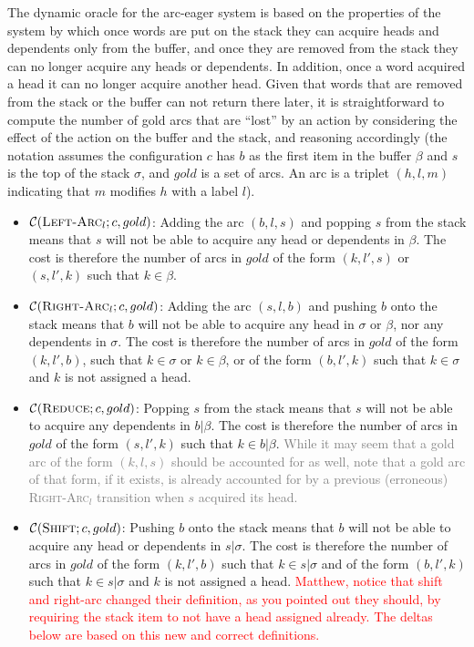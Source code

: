 \documentclass[11pt,letterpaper]{article}
\newcommand{\maybe}[1]{\textcolor{gray}{#1}}
\newcommand{\note}[1]{\textcolor{red}{#1}}
\begin{document}
The dynamic oracle for the arc-eager system is based on the properties of the
system by which once words are put on the stack they can acquire heads and
dependents only from the buffer, and once they are removed from the stack they
can no longer acquire any heads or dependents. In addition, once a word
acquired a head it can no longer acquire another head.  Given that words that
are removed from the stack or the buffer can not return there later, it
is straightforward to compute the number of gold arcs that are ``lost'' by an
action by considering the effect of the action on the buffer and the stack,
and reasoning accordingly (the notation assumes the configuration $c$ has $b$
as the first item in the buffer $\beta$ and $s$ is the top of the stack
$\sigma$, and $gold$ is a set of arcs. An arc is a triplet $(h,l,m)$
indicating that $m$ modifies $h$ with a label $l$).




\begin{itemize}
   \item $\mathcal{C}(\textsc{Left-Arc}_l; c, gold)$: 
Adding the arc $(b, l, s)$ and popping $s$ from the stack means that $s$ will not be able
to acquire any head or dependents in $\beta$. The cost is therefore the number of arcs 
in $gold$ of the form $(k, l', s)$ or $(s, l', k)$ such that $k \in \beta$.

\item $\mathcal{C}(\textsc{Right-Arc}_l; c, gold)$: 
Adding the arc $(s, l, b)$ and pushing $b$ onto the stack means that $b$ will 
not be able to acquire any head in $\sigma$ or $\beta$, nor any dependents in $\sigma$. 
The cost is therefore the number of arcs in $gold$ of the form $(k, l', b)$,
such that $k \in \sigma$ or $k \in \beta$, 
or of the form $(b, l', k)$ such that $k \in \sigma$ 
and $k$ is not assigned a head.

\item $\mathcal{C}(\textsc{Reduce}; c, gold)$: 
Popping $s$ from the stack means that $s$ will not be able to acquire any dependents
in $b|\beta$. The cost is therefore the number of arcs in $gold$ of the form $(s, l', k)$
such that $k \in b|\beta$. \maybe{While it may seem that a gold arc of the form $(k, l, s)$ should be accounted for as well,
note that a gold arc of that form, if it exists, is already accounted for by a previous (erroneous) \textsc{Right-Arc}$_l$ 
transition when $s$ acquired its head.}

\item $\mathcal{C}(\textsc{Shift}; c, gold)$: 
Pushing $b$ onto the stack means that $b$ will not be able to acquire any head
or dependents in $s|\sigma$. The cost is therefore the number of arcs in $gold$ of 
the form $(k, l', b)$ such that $k \in s|\sigma$ and of the form $(b, l', k)$ such that $k \in s|\sigma$
and $k$ is not assigned a head.
\note{Matthew, notice that shift and right-arc changed their definition, as
you pointed out they should, by requiring the stack item to not have a head
assigned already. The deltas below are based on this new and correct
definitions.}
\end{itemize}
\end{document}
